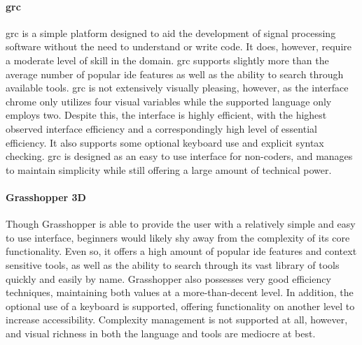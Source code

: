 \paragraph{\acl{grc}} \ac{grc} is a simple platform designed to aid the
development of signal processing software without the need to understand or
write code. It does, however, require a moderate level of skill in the
domain. \ac{grc} supports slightly more than the average number of popular
\ac{ide} features as well as the ability to search through available tools.
\ac{grc} is not extensively visually pleasing, however, as the interface
chrome only utilizes four visual variables while the supported language
only employs two. Despite this, the interface is highly efficient, with the
highest observed interface efficiency and a correspondingly high level of
essential efficiency. It also supports some optional keyboard use and
explicit syntax checking. \ac{grc} is designed as an easy to use interface
for non-coders, and manages to maintain simplicity while still offering a
large amount of technical power.

\paragraph{Grasshopper 3D} Though Grasshopper is able to provide the user
with a relatively simple and easy to use interface, beginners would likely
shy away from the complexity of its core functionality. Even so, it offers
a high amount of popular \ac{ide} features and context sensitive tools, as
well as the ability to search through its vast library of tools quickly and
easily by name. Grasshopper also possesses very good efficiency techniques,
maintaining both values at a more-than-decent level. In addition, the
optional use of a keyboard is supported, offering functionality on another
level to increase accessibility. Complexity management is not supported at
all, however, and visual richness in both the language and tools are
mediocre at best.

